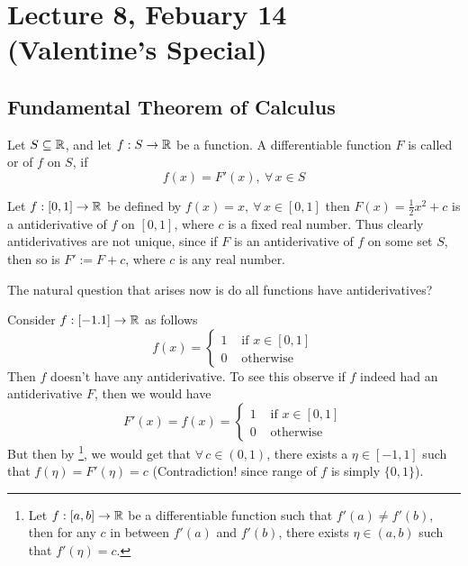 \chapter*{Lecture 8, Febuary 14 \\ {\Large (Valentine's Special) }}
\setcounter{chapter}{8}
\setcounter{section}{0}

\section{Fundamental Theorem of Calculus}

\begin{defn}\label{def1:feb14}
    Let $S \subseteq \mathbb{R}$, and let $f : S \to \mathbb{R}$ be a function. A differentiable function $F$ is called  or  of $f$ on $S$, if 
    \[
        f(x) = F'(x), \ \forall \, x \in S   
    \]  
\end{defn}

\begin{example}\label{eg1:feb14}
    Let $f : [0,1] \to \mathbb{R}$ be defined by $f(x) = x, \ \forall \, x \in [0,1]$ then $F(x) = \frac{1}{2}x^2 + c$ is a antiderivative of $f$ on $[0,1]$, where $c$ is a fixed real number. Thus clearly antiderivatives are not unique, since if $F$ is an antiderivative of $f$ on some set $S$, then so is $F' := F+c$, where $c$ is any real number.
\end{example}

The natural question that arises now is do all functions have antiderivatives? 

\begin{example}\label{eg2:feb14}
    Consider $f : [-1.1] \to \mathbb{R}$ as follows 
    \[ 
        f(x) = 
        \begin{cases}
            1 & \mbox{ if } x \in [0,1] \\ 
            0 & \mbox{ otherwise }    
        \end{cases}    
    \]
    Then $f$ doesn't have any antiderivative. To see this observe if $f$ indeed had an antiderivative $F$, then we would have 
    \[
        F'(x) = f(x) = 
        \begin{cases}
            1 & \mbox{ if } x \in [0,1] \\ 
            0 & \mbox{ otherwise }    
        \end{cases}      
    \]
    But then by \footnote{ Let $f : [a,b] \to \mathbb{R}$ be a differentiable function such that $f'(a) \neq f'(b)$, then for any $c$ in between $f'(a)$ and $f'(b)$, there exists $\eta \in (a,b)$ such that $f'(\eta) = c$.}, we would get that $\forall \, c \in (0,1)$, there exists a $\eta \in [-1,1]$ such that $f(\eta) = F'(\eta) = c$ (Contradiction! since range of $f$ is simply $\{0,1\}$).
\end{example}

